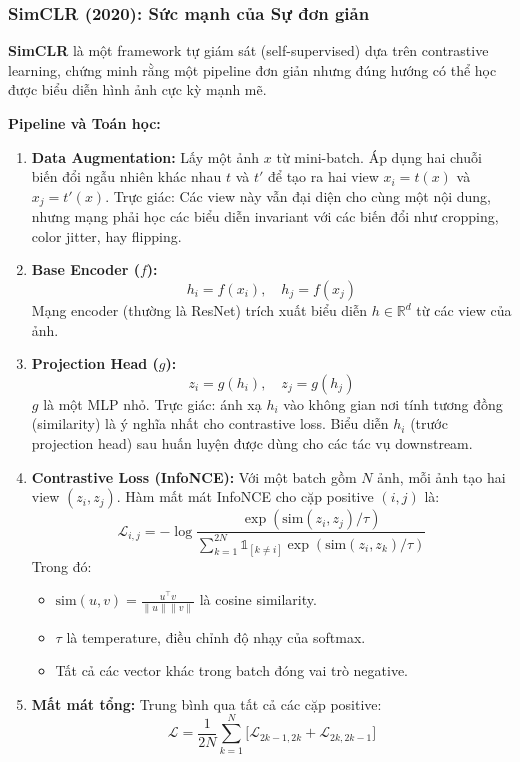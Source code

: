 \subsubsection{SimCLR (2020): Sức mạnh của Sự đơn giản}
\label{subsubsec:simclr}

\textbf{SimCLR} \cite{Chen2020} là một framework tự giám sát (self-supervised) dựa trên contrastive learning, chứng minh rằng một pipeline đơn giản nhưng đúng hướng có thể học được biểu diễn hình ảnh cực kỳ mạnh mẽ.

\textbf{Pipeline và Toán học:}

\begin{enumerate}
	\item \textbf{Data Augmentation:} Lấy một ảnh $x$ từ mini-batch. Áp dụng hai chuỗi biến đổi ngẫu nhiên khác nhau $t$ và $t'$ để tạo ra hai view $x_i = t(x)$ và $x_j = t'(x)$.  
	Trực giác: Các view này vẫn đại diện cho cùng một nội dung, nhưng mạng phải học các biểu diễn invariant với các biến đổi như cropping, color jitter, hay flipping.
	
	\item \textbf{Base Encoder ($f$):}  
	\[
	h_i = f(x_i), \quad h_j = f(x_j)
	\]  
	Mạng encoder (thường là ResNet) trích xuất biểu diễn $h \in \mathbb{R}^d$ từ các view của ảnh.
	
	\item \textbf{Projection Head ($g$):}  
	\[
	z_i = g(h_i), \quad z_j = g(h_j)
	\]  
	$g$ là một MLP nhỏ. Trực giác: ánh xạ $h_i$ vào không gian nơi tính tương đồng (similarity) là ý nghĩa nhất cho contrastive loss. Biểu diễn $h_i$ (trước projection head) sau huấn luyện được dùng cho các tác vụ downstream.
	
	\item \textbf{Contrastive Loss (InfoNCE):}  
	Với một batch gồm $N$ ảnh, mỗi ảnh tạo hai view $(z_i, z_j)$. Hàm mất mát InfoNCE cho cặp positive $(i,j)$ là:
	\[
	\mathcal{L}_{i,j} = -\log \frac{\exp(\text{sim}(z_i, z_j)/\tau)}{\sum_{k=1}^{2N} \mathbb{1}_{[k \neq i]} \exp(\text{sim}(z_i, z_k)/\tau)}
	\]  
	Trong đó:
	\begin{itemize}
		\item $\text{sim}(u,v) = \frac{u^\top v}{\|u\|\|v\|}$ là cosine similarity.
		\item $\tau$ là temperature, điều chỉnh độ nhạy của softmax.
		\item Tất cả các vector khác trong batch đóng vai trò negative.
	\end{itemize}
	
	\item \textbf{Mất mát tổng:} Trung bình qua tất cả các cặp positive:
	\[
	\mathcal{L} = \frac{1}{2N} \sum_{k=1}^N \big[ \mathcal{L}_{2k-1,2k} + \mathcal{L}_{2k,2k-1} \big]
	\]
\end{enumerate}

